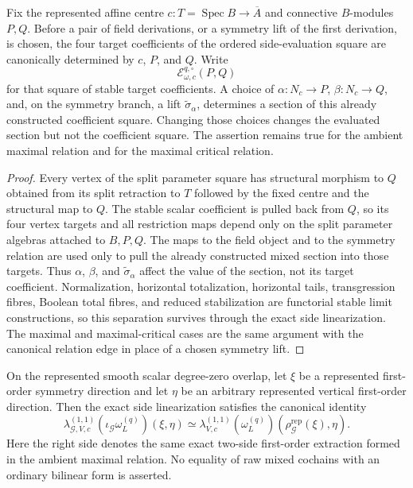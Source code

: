 \begin{lemma}
\label{lem:symmetry-noether-side-coefficient-and-evaluated-section-separation}
Fix the represented affine centre $c:T=\operatorname{Spec}B\to\overline A$ and
connective $B$-modules $P,Q$.  Before a pair of field derivations, or a
symmetry lift of the first derivation, is chosen, the four target coefficients of
the ordered side-evaluation square are canonically determined by $c$, $P$, and $Q$.
Write
\[
\mathscr E_{\omega,c}^{q,\square}(P,Q)
\]
for that square of stable target coefficients.  A choice of
$\alpha:N_c\to P$, $\beta:N_c\to Q$, and, on the symmetry branch, a lift
$\widetilde\sigma_\alpha$, determines a section of this already constructed
coefficient square.  Changing those choices changes the evaluated section but not
the coefficient square.  The assertion remains true for the ambient maximal
relation and for the maximal critical relation.
\end{lemma}

\begin{proof}
Every vertex of the split parameter square has structural morphism to $Q$ obtained
from its split retraction to $T$ followed by the fixed centre and the structural
map to $Q$.  The stable scalar coefficient is pulled back from $Q$, so its four
vertex targets and all restriction maps depend only on the split parameter algebras
attached to $B,P,Q$.  The maps to the field object and to the symmetry relation are
used only to pull the already constructed mixed section into those targets.  Thus
$\alpha$, $\beta$, and $\widetilde\sigma_\alpha$ affect the value of the section,
not its target coefficient.  Normalization, horizontal totalization, horizontal
tails, transgression fibres, Boolean total fibres, and reduced stabilization are
functorial stable limit constructions, so this separation survives through the
exact side linearization.  The maximal and maximal-critical cases are the same
argument with the canonical relation edge in place of a chosen symmetry lift.
\end{proof}

\begin{theorem}
\label{thm:symmetry-noether-represented-first-order-contraction-recognition}
On the represented smooth scalar degree-zero overlap, let $\xi$ be a represented
first-order symmetry direction and let $\eta$ be an arbitrary represented vertical
first-order direction.  Then the exact side linearization satisfies the canonical
identity
\[
\boxed{
\lambda_{\mathcal G,V,c}^{(1,1)}
\left(\iota_{\mathcal G}\omega_L^{(q)}\right)(\xi,\eta)
\simeq
\lambda_{V,c}^{(1,1)}
\left(\omega_L^{(q)}\right)
\left(\rho_{\mathcal G}^{\mathrm{rep}}(\xi),\eta\right).
}
\]
Here the right side denotes the same exact two-side first-order extraction formed in
the ambient maximal relation.  No equality of raw mixed cochains with an ordinary
bilinear form is asserted.
\end{theorem}

